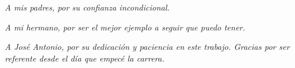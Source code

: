 \vspace*{8.5cm}
\begin{flushright}
  \textit{A mis padres, por su confianza incondicional.}

  \textit{A mi hermano, por ser el mejor ejemplo a seguir que puedo tener.}

  \textit{A José Antonio, por su dedicación y paciencia en este trabajo.
    Gracias por ser referente desde el día que empecé la carrera.}
\end{flushright}